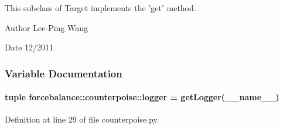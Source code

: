 \-This subclass of \-Target implements the 'get' method.

\begin{DoxyAuthor}{\-Author}
\-Lee-\/\-Ping \-Wang 
\end{DoxyAuthor}
\begin{DoxyDate}{\-Date}
12/2011 
\end{DoxyDate}


\subsubsection{\-Variable \-Documentation}
\hypertarget{namespaceforcebalance_1_1counterpoise_a5a5391fb65604f4aeba9c2e39557b547}{
\paragraph[{logger}]{\setlength{\rightskip}{0pt plus 5cm}tuple {\bf forcebalance\-::counterpoise\-::logger} = get\-Logger(\-\_\-\-\_\-name\-\_\-\-\_\-)}}\label{namespaceforcebalance_1_1counterpoise_a5a5391fb65604f4aeba9c2e39557b547}


\-Definition at line 29 of file counterpoise.\-py.

